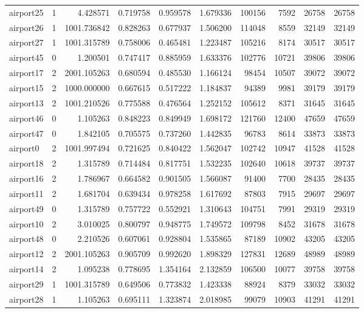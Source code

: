 \documentclass[../../../thesis.tex]{subfiles}
\begin{document}
\begin{longtable}{|l|r|r|r|r|r|r|r|r|r|}
airport25 & 1 & 4.428571 & 0.719758 & 0.959578 & 1.679336 & 100156 & 7592 & 26758 & 26758 \\
airport26 & 1 & 1001.736842 & 0.828263 & 0.677937 & 1.506200 & 114048 & 8559 & 32149 & 32149 \\
airport27 & 1 & 1001.315789 & 0.758006 & 0.465481 & 1.223487 & 105216 & 8174 & 30517 & 30517 \\
airport45 & 0 & 1.200501 & 0.747417 & 0.885959 & 1.633376 & 102776 & 10721 & 39806 & 39806 \\
airport17 & 2 & 2001.105263 & 0.680594 & 0.485530 & 1.166124 & 98454 & 10507 & 39072 & 39072 \\
airport15 & 2 & 1000.000000 & 0.667615 & 0.517222 & 1.184837 & 94389 & 9981 & 39179 & 39179 \\
airport13 & 2 & 1001.210526 & 0.775588 & 0.476564 & 1.252152 & 105612 & 8371 & 31645 & 31645 \\
airport46 & 0 & 1.105263 & 0.848223 & 0.849949 & 1.698172 & 121760 & 12400 & 47659 & 47659 \\
airport47 & 0 & 1.842105 & 0.705575 & 0.737260 & 1.442835 & 96783 & 8614 & 33873 & 33873 \\
airport0 & 2 & 1001.997494 & 0.721625 & 0.840422 & 1.562047 & 102742 & 10947 & 41528 & 41528 \\
airport18 & 2 & 1.315789 & 0.714484 & 0.817751 & 1.532235 & 102640 & 10618 & 39737 & 39737 \\
airport16 & 2 & 1.786967 & 0.664582 & 0.901505 & 1.566087 & 91400 & 7700 & 28435 & 28435 \\
airport11 & 2 & 1.681704 & 0.639434 & 0.978258 & 1.617692 & 87803 & 7915 & 29697 & 29697 \\
airport49 & 0 & 1.315789 & 0.757722 & 0.552921 & 1.310643 & 104751 & 7991 & 29319 & 29319 \\
airport10 & 2 & 3.010025 & 0.800797 & 0.948775 & 1.749572 & 109798 & 8452 & 31678 & 31678 \\
airport48 & 0 & 2.210526 & 0.607061 & 0.928804 & 1.535865 & 87189 & 10902 & 43205 & 43205 \\
airport12 & 2 & 2001.105263 & 0.905709 & 0.992620 & 1.898329 & 127831 & 12689 & 48989 & 48989 \\
airport14 & 2 & 1.095238 & 0.778695 & 1.354164 & 2.132859 & 106500 & 10077 & 39758 & 39758 \\
airport29 & 1 & 1001.315789 & 0.649506 & 0.773832 & 1.423338 & 88924 & 8379 & 33032 & 33032 \\
airport28 & 1 & 1.105263 & 0.695111 & 1.323874 & 2.018985 & 99079 & 10903 & 41291 & 41291 \\

\end{longtable}
\end{document}

